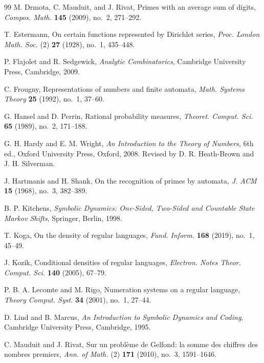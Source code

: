 \documentclass[11pt,a4paper]{amsart}
\theoremstyle{plain}
\theoremstyle{definition}
\theoremstyle{remark}
\begin{document}
\begin{thebibliography}{99}
M. Drmota, C. Mauduit, and J. Rivat,
Primes with an average sum of digits,
\textit{Compos. Math.} \textbf{145} (2009), no.~2, 271--292.

T. Estermann,
On certain functions represented by Dirichlet series,
\textit{Proc. London Math. Soc.} (2) \textbf{27} (1928), no.~1, 435--448.

P. Flajolet and R. Sedgewick,
\textit{Analytic Combinatorics},
Cambridge University Press, Cambridge, 2009.

C. Frougny,
Representations of numbers and finite automata,
\textit{Math. Systems Theory} \textbf{25} (1992), no.~1, 37--60.

G. Hansel and D. Perrin,
Rational probability measures,
\textit{Theoret. Comput. Sci.} \textbf{65} (1989), no.~2, 171--188.

G. H. Hardy and E. M. Wright,
\textit{An Introduction to the Theory of Numbers},
6th ed., Oxford University Press, Oxford, 2008.
Revised by D. R. Heath-Brown and J. H. Silverman.

J. Hartmanis and H. Shank,
On the recognition of primes by automata,
\textit{J. ACM} \textbf{15} (1968), no.~3, 382--389.

B. P. Kitchens,
\textit{Symbolic Dynamics: One-Sided, Two-Sided and Countable State
Markov Shifts},
Springer, Berlin, 1998.

T. Koga,
On the density of regular languages,
\textit{Fund. Inform.} \textbf{168} (2019), no.~1, 45--49.

J. Kozik,
Conditional densities of regular languages,
\textit{Electron. Notes Theor. Comput. Sci.} \textbf{140} (2005), 67--79.

P. B. A. Lecomte and M. Rigo,
Numeration systems on a regular language,
\textit{Theory Comput. Syst.} \textbf{34} (2001), no.~1, 27--44.

D. Lind and B. Marcus,
\textit{An Introduction to Symbolic Dynamics and Coding},
Cambridge University Press, Cambridge, 1995.

C. Mauduit and J. Rivat,
Sur un probl{\`e}me de Gelfond: la somme des chiffres des nombres
premiers,
\textit{Ann. of Math.} (2) \textbf{171} (2010), no.~3, 1591--1646.


\end{thebibliography}
\end{document}
